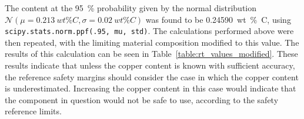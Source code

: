 \documentclass{article}
\begin{document}
    The  content at the \SI{95}{\percent} probability given by the normal distribution $\mathcal{N}(\mu=\SI{0.213}{wt\percent C}, \sigma=\SI{0.02}{wt\percent C})$ was found to be \SI{0.24590}{wt\percent C}, using \texttt{scipy.stats.norm.ppf(.95, mu, std)}. The calculations performed above were then repeated, with the limiting material composition modified to this value. The results of this calculation can be seen in Table~\ref{table:rt_values_modified}. These results indicate that unless the copper content is known with sufficient accuracy, the reference safety margins should consider the case in which the copper content is underestimated. Increasing the copper content in this case would indicate that the component in question would not be safe to use, according to the safety reference limits.
    
\end{document}
